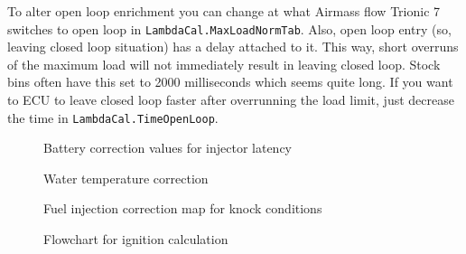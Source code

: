 \documentclass[11pt,a4paper]{book}
\begin{document}
To alter open loop enrichment you can change at what Airmass flow Trionic 7
switches to open loop in \texttt{LambdaCal.MaxLoadNormTab}. Also, open loop
entry (so, leaving closed loop situation) has a delay attached to it. This way,
short overruns of the maximum load will not immediately result in leaving closed
loop. Stock bins often have this set to 2000 milliseconds which seems quite
long. If you want to ECU to leave closed loop faster after overrunning the load
limit, just decrease the time in \texttt{LambdaCal.TimeOpenLoop}.

\begin{figure}
    \centering
    \missingfigure{}
    \caption{Battery correction values for injector latency}
    \label{fig:}
\end{figure}

\begin{figure}
    \centering
    \missingfigure{}
    \caption{Water temperature correction}
    \label{fig:}
\end{figure}

\begin{figure}
    \centering
    \missingfigure{}
    \caption{Fuel injection correction map for knock conditions}
    \label{fig:}
\end{figure}
\begin{figure}
    \centering
    
    \caption{Flowchart for ignition calculation}
    \label{fig:}
\end{figure}
\end{document}
